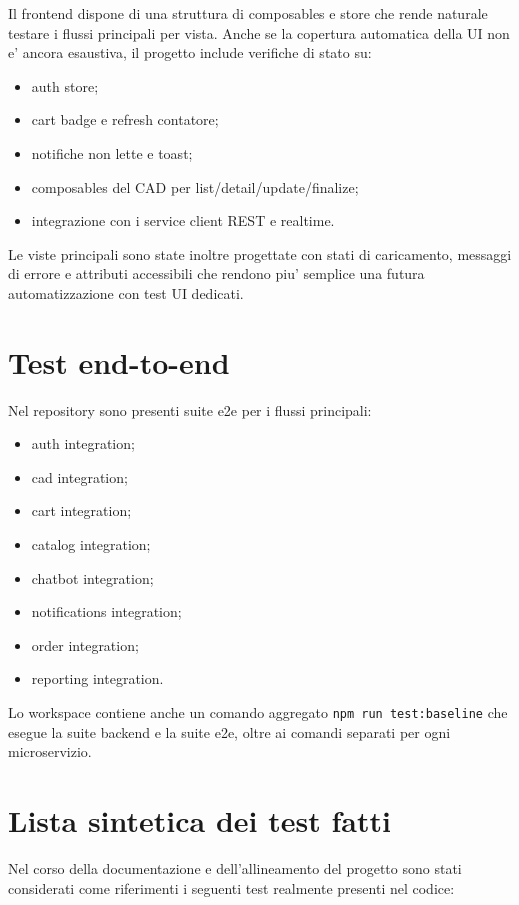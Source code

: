 Il frontend dispone di una struttura di composables e store che rende naturale testare i flussi principali per vista. Anche se la copertura automatica della UI non e' ancora esaustiva, il progetto include verifiche di stato su:

\begin{itemize}
\item auth store;
\item cart badge e refresh contatore;
\item notifiche non lette e toast;
\item composables del CAD per list/detail/update/finalize;
\item integrazione con i service client REST e realtime.
\end{itemize}

Le viste principali sono state inoltre progettate con stati di caricamento, messaggi di errore e attributi accessibili che rendono piu' semplice una futura automatizzazione con test UI dedicati.

\section{Test end-to-end}

Nel repository sono presenti suite e2e per i flussi principali:

\begin{itemize}
\item auth integration;
\item cad integration;
\item cart integration;
\item catalog integration;
\item chatbot integration;
\item notifications integration;
\item order integration;
\item reporting integration.
\end{itemize}

Lo workspace contiene anche un comando aggregato \texttt{npm run test:baseline} che esegue la suite backend e la suite e2e, oltre ai comandi separati per ogni microservizio.

\section{Lista sintetica dei test fatti}

Nel corso della documentazione e dell'allineamento del progetto sono stati considerati come riferimenti i seguenti test realmente presenti nel codice:

